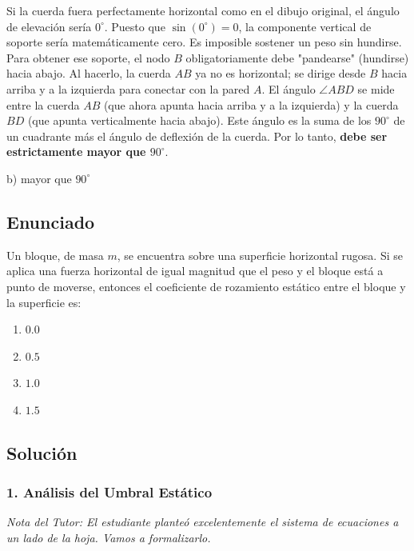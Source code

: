 \documentclass[12pt, a4paper]{article}
\begin{document}
Si la cuerda fuera perfectamente horizontal como en el dibujo original, el ángulo de elevación sería $0^\circ$. Puesto que $\sin(0^\circ) = 0$, la componente vertical de soporte sería matemáticamente cero. Es imposible sostener un peso sin hundirse.
Para obtener ese soporte, el nodo $B$ obligatoriamente debe "pandearse" (hundirse) hacia abajo.
Al hacerlo, la cuerda $AB$ ya no es horizontal; se dirige desde $B$ hacia arriba y a la izquierda para conectar con la pared $A$.
El ángulo $\angle ABD$ se mide entre la cuerda $AB$ (que ahora apunta hacia arriba y a la izquierda) y la cuerda $BD$ (que apunta verticalmente hacia abajo). Este ángulo es la suma de los $90^\circ$ de un cuadrante más el ángulo de deflexión de la cuerda. Por lo tanto, \textbf{debe ser estrictamente mayor que $90^\circ$}.

\begin{tcolorbox}[colback=green!5!white, colframe=green!50!black, title=Respuesta Final]
\centering \Large b) mayor que $90^\circ$
\end{tcolorbox}

\newpage

\subsection*{Enunciado}
Un bloque, de masa $m$, se encuentra sobre una superficie horizontal rugosa. Si se aplica una fuerza horizontal de igual magnitud que el peso y el bloque está a punto de moverse, entonces el coeficiente de rozamiento estático entre el bloque y la superficie es:
\begin{enumerate}[label=\alph*)]
    \item $0.0$
    \item $0.5$
    \item $1.0$
    \item $1.5$
\end{enumerate}

\subsection*{Solución}

\subsubsection*{1. Análisis del Umbral Estático}
\textit{Nota del Tutor: El estudiante planteó excelentemente el sistema de ecuaciones a un lado de la hoja. Vamos a formalizarlo.}
\end{document}
